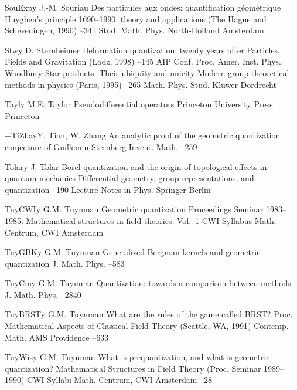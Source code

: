 \documentclass[11pt]{amsart}
\numberwithin{equation}{section}
\theoremstyle{remark}
\newcommand{\by}{\mathbf y}
\begin{document}
\begin{thebibliography}{199}
 SouExp\by{ J.-M. Souriau \paper Des particules aux ondes: quantification
g\'eom\'etrique \inbook Huyghen's principle 1690--1990: theory and applications
(The Hague and Scheveningen, 1990) --341 \bookinfo Stud. Math. Phys.
 \publ North-Holland \publaddr Amsterdam }

 Stw\by{ D. Sternheimer \paper Deformation quantization: twenty years
after \inbook Particles, Fields and Gravitation (\L odz, 1998) --145
\bookinfo AIP Conf. Proc.  \publ Amer. Inst. Phys. \publaddr Woodbury
 \moreref \paper Star products: Their ubiquity and unicity \inbook
Modern group theoretical methods in physics (Paris, 1995) --265
\bookinfo Math. Phys. Stud.  \publ Kluwer \publaddr Dordrecht }

 Tayl\by{ M.E. Taylor \book Pseudodifferential operators \publ Princeton
University Press \publaddr Princeton }

 +TiZha\by{Y. Tian, W. Zhang \paper An analytic proof of the geometric
quantization conjecture of Guillemin-Sternberg \jour Invent. Math. 
 --259}

 Tolar\by{ J. Tolar \paper Borel quantization and the origin of
topological effects in quantum mechanics \inbook Differential geometry, group
representations, and quantization --190 \bookinfo Lecture Notes in
Phys.  \publ Springer \publaddr Berlin }

 TuyCWI\by{ G.M. Tuynman \book Geometric quantization \bookinfo
Proceedings Seminar 1983--1985: Mathematical structures in field theories.
Vol.~1 \bookinfo CWI Syllabus  \publ Math. Centrum, CWI \publaddr
Amsterdam }

 TuyGBK\by{ G.M. Tuynman \paper Generalized Bergman kernels and geometric
quantization \jour J. Math. Phys.   --583}

 TuyCm\by{ G.M. Tuynman \paper Quantization: towards a comparison between
methods \jour J. Math. Phys.   --2840}

 TuyBRST\by{ G.M. Tuynman \paper What are the rules of the game called
BRST? \inbook Proc. Mathematical Aspects of Classical Field Theory (Seattle,
WA, 1991) \bookinfo Contemp. Math.  \publ AMS \publaddr Providence  --633}

 TuyWis\by{ G.M. Tuynman \paper What is prequantization, and what is
geometric quantization? \inbook  Mathematical Structures in Field Theory
(Proc. Seminar 1989--1990) \bookinfo CWI Syllabi  \publ Math. Centrum,
CWI \publaddr Amsterdam --28 }


\end{thebibliography}
\end{document}
